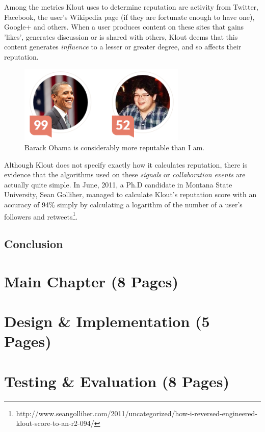 \documentclass[]{final_report}
\begin{document}
Among the metrics Klout uses to determine reputation are activity from Twitter, Facebook, the user's Wikipedia page (if they are fortunate enough to have one), Google+ and others. When a user produces content on these sites that gains 'likes', generates discussion or is shared with others, Klout deems that this content generates \textsl{influence} to a lesser or greater degree, and so affects their reputation.

\begin{figure}[ht!]
\centering
\includegraphics[width=80mm]{klout.png}
\caption{Barack Obama is considerably more reputable than I am.}
\end{figure}

Although Klout does not specify exactly how it calculates reputation, there is evidence that the algorithms used on these \textsl{signals} or \textsl{collaboration events} are actually quite simple. In June, 2011, a Ph.D candidate in Montana State University, Sean Golliher, managed to calculate Klout's reputation score with an accuracy of 94\% simply by calculating a logarithm of the number of a user's followers and retweets\footnote{http://www.seangolliher.com/2011/uncategorized/how-i-reversed-engineered-klout-score-to-an-r2-094/}.

\section{Conclusion}

\chapter{Main Chapter (8 Pages)}

\chapter{Design \& Implementation (5 Pages)}

\chapter{Testing \& Evaluation (8 Pages)}
\end{document}

